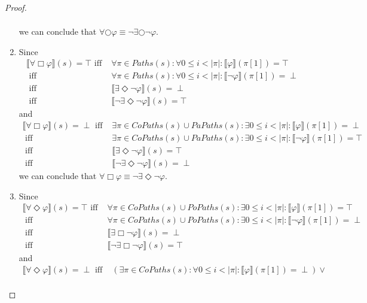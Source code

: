 \documentclass[12pt]{article}
\newcommand{\always}{\Box}
\newcommand{\eventually}{\Diamond}
\newcommand{\nxt}{\bigcirc}
\theoremstyle{definition}
\newcommand{\satisfaction}[1]{\llbracket #1 \rrbracket}
\newenvironment{franck}{\color{red}}{\color{black}}
\begin{document}
\begin{franck}
\begin{proof}
\begin{enumerate}
\begin{align*}
\end{align*}
we can conclude that $\forall \nxt \varphi \equiv \neg \exists \nxt \neg \varphi$.
\item
Since
\begin{align*}
\satisfaction{\forall \always \varphi}(s) = \top
\mbox{ iff } & \forall \pi \in \mathit{Paths}(s) : \forall 0 \leq i < |\pi| : \satisfaction{\varphi}(\pi[1]) = \top\\
\mbox{ iff } & \forall \pi \in \mathit{Paths}(s) : \forall 0 \leq i < |\pi| : \satisfaction{\neg \varphi}(\pi[1]) = \perp\\
\mbox{ iff } & \satisfaction{\exists \eventually \neg \varphi}(s) = \perp\\
\mbox{ iff } & \satisfaction{\neg \exists \eventually \neg \varphi}(s) = \top
\end{align*}
and
\begin{align*}
\satisfaction{\forall \always \varphi}(s) = \perp
\mbox{ iff } & \exists \pi \in \mathit{CoPaths}(s) \cup \mathit{PaPaths}(s) : \exists 0 \leq i < |\pi| : \satisfaction{\varphi}(\pi[1]) = \perp\\
\mbox{ iff } & \exists \pi \in \mathit{CoPaths}(s) \cup \mathit{PaPaths}(s) : \exists 0 \leq i < |\pi| : \satisfaction{\neg \varphi}(\pi[1]) = \top\\
\mbox{ iff } & \satisfaction{\exists \eventually \neg \varphi}(s) = \top\\
\mbox{ iff } & \satisfaction{\neg \exists \eventually \neg \varphi}(s) = \perp
\end{align*}
we can conclude that $\forall \always \varphi \equiv \neg \exists \eventually \neg \varphi$.
\item
Since
\begin{align*}
\satisfaction{\forall \eventually \varphi}(s) = \top
\mbox{ iff } & \forall \pi \in \mathit{CoPaths}(s) \cup \mathit{PoPaths}(s) : \exists 0 \leq i < |\pi| : \satisfaction{\varphi}(\pi[1]) = \top\\
\mbox{ iff } & \forall \pi \in \mathit{CoPaths}(s) \cup \mathit{PoPaths}(s) : \exists 0 \leq i < |\pi| : \satisfaction{\neg \varphi}(\pi[1]) = \perp\\
\mbox{ iff } & \satisfaction{\exists \always \neg \varphi}(s) = \perp\\
\mbox{ iff } & \satisfaction{\neg \exists \always \neg \varphi}(s) = \top
\end{align*}
and
\begin{align*}
\satisfaction{\forall \eventually \varphi}(s) = \perp
\mbox{ iff } & (\exists \pi \in \mathit{CoPaths}(s) : \forall 0 \leq i < |\pi| : \satisfaction{\varphi}(\pi[1]) = \perp) \vee\\

\end{align*}
\end{enumerate}
\end{proof}
\end{franck}
\end{document}
